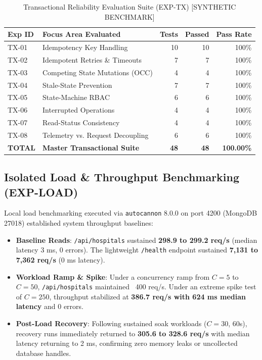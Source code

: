 \documentclass[conference]{IEEEtran}
\begin{document}
\begin{table}[t]
\caption{Transactional Reliability Evaluation Suite (EXP-TX) [SYNTHETIC BENCHMARK]}
\label{tab:transactional_suite}
\centering
\setlength{\tabcolsep}{2.5pt}
\begin{tabularx}{\linewidth}{lXrrr}
\toprule
Exp ID & Focus Area Evaluated & Tests & Passed & Pass Rate \\
\midrule
TX-01 & Idempotency Key Handling & 10 & 10 & 100\% \\
TX-02 & Idempotent Retries \& Timeouts & 7 & 7 & 100\% \\
TX-03 & Competing State Mutations (OCC) & 4 & 4 & 100\% \\
TX-04 & Stale-State Prevention & 7 & 7 & 100\% \\
TX-05 & State-Machine RBAC & 6 & 6 & 100\% \\
TX-06 & Interrupted Operations & 4 & 4 & 100\% \\
TX-07 & Read-Status Consistency & 4 & 4 & 100\% \\
TX-08 & Telemetry vs. Request Decoupling & 6 & 6 & 100\% \\
\midrule
\textbf{TOTAL} & \textbf{Master Transactional Suite} & \textbf{48} & \textbf{48} & \textbf{100.00\%} \\
\bottomrule
\end{tabularx}
\end{table}

\subsection{Isolated Load \& Throughput Benchmarking (EXP-LOAD)}
Local load benchmarking executed via \texttt{autocannon} 8.0.0 on port 4200 (MongoDB 27018) established system throughput baselines:
\begin{itemize}
    \item \textbf{Baseline Reads}: \texttt{/api/hospitals} sustained \textbf{298.9 to 299.2 req/s} (median latency 3 ms, 0 errors). The lightweight \texttt{/health} endpoint sustained \textbf{7,131 to 7,362 req/s} (0 ms latency).
    \item \textbf{Workload Ramp \& Spike}: Under a concurrency ramp from $C=5$ to $C=50$, \texttt{/api/hospitals} maintained ~400 req/s. Under an extreme spike test of $C=250$, throughput stabilized at \textbf{386.7 req/s with 624 ms median latency} and 0 errors.
    \item \textbf{Post-Load Recovery}: Following sustained soak workloads ($C=30$, 60s), recovery runs immediately returned to \textbf{305.6 to 328.6 req/s} with median latency returning to 2 ms, confirming zero memory leaks or uncollected database handles.
\end{itemize}
\end{document}
